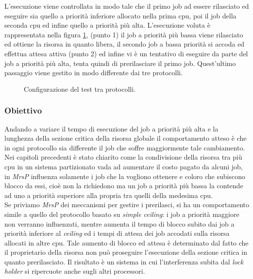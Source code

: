 \noindent L'esecuzione viene controllata in modo tale che il primo job ad essere rilasciato ed eseguire sia quello a priorità inferiore allocato nella prima cpu, poi il job della seconda cpu ed infine quello a priorità più alta. L'esecuzione voluta è rappresentata nella figura \ref{fig:test_protocols}, (punto 1) il job a priorità più bassa viene rilasciato ed ottiene la risorsa in quanto libera, il secondo job a bassa priorità si accoda ed effettua attesa attiva (punto 2) ed infine vi è un tentativo di eseguire da parte del job a priorità più alta, tenta quindi di prerilasciare il primo job. Quest'ultimo passaggio viene gestito in modo differente dai tre protocolli.\\

\begin{figure}
\centering
{}
\caption{Configurazione del test tra protocolli.}
\label{fig:test_protocols}
\end{figure}

\subsubsection{Obiettivo}
\label{sec:confronto_protocolli_ob}

\noindent Andando a variare il tempo di esecuzione del job a priorità più alta e la lunghezza della sezione critica della risorsa globale il comportamento atteso è che in ogni protocollo sia differente il job che soffre maggiormente tale cambiamento.\\

\noindent Nei capitoli precedenti è stato chiarito come la condivisione della risorsa tra più cpu in un sistema partizionato vada ad aumentare il costo pagato da alcuni job, in \textit{MrsP} influenza solamente i job che la vogliono ottenere e coloro che subiscono blocco da essi, cioè non la richiedono ma un job a priorità più bassa la contende ad uno a priorità superiore alla propria tra quelli della medesima cpu.\\

\noindent Se priviamo \textit{MrsP} dei meccanismi per gestire i prerilasci, si ha un comportamento simile a quello del protocollo basato su \textit{simple ceiling}: i job a priorità maggiore non verranno influenzati, mentre aumenta il tempo di blocco subito dai job a priorità inferiore al \textit{ceiling} ed i tempi di attesa dei job accodati sulla risorsa allocati in altre cpu. Tale aumento di blocco ed attesa è determinato dal fatto che il proprietario della risorsa non può proseguire l'esecuzione della sezione critica in quanto prerilasciato. Il risultato è un sistema in cui l'interferenza subita dal \textit{lock holder} si ripercuote anche sugli altri processori.\\

